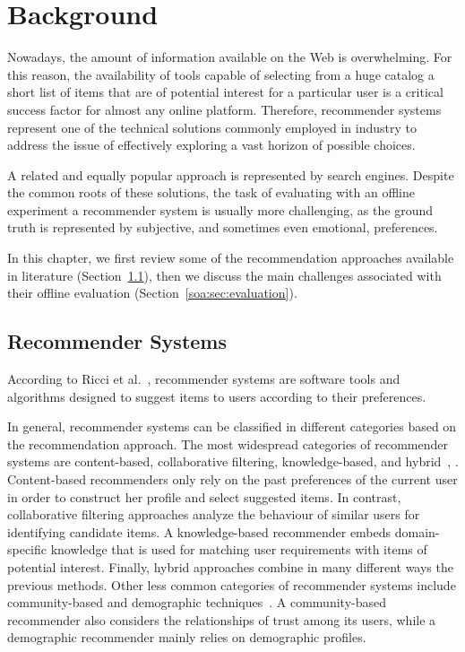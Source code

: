 \chapter{Background}
\label{chap:background}

Nowadays, the amount of information available on the Web is overwhelming. For this reason, the availability of tools capable of selecting from a huge catalog a short list of items that are of potential interest for a particular user is a critical success factor for almost any online platform. Therefore, recommender systems represent one of the technical solutions commonly employed in industry to address the issue of effectively exploring a vast horizon of possible choices.

A related and equally popular approach is represented by search engines. Despite the common roots of these solutions, the task of evaluating with an offline experiment a recommender system is usually more challenging, as the ground truth is represented by subjective, and sometimes even emotional, preferences.

In this chapter, we first review some of the recommendation approaches available in literature (Section~\ref{soa:sec:recommender}), then we discuss the main challenges associated with their offline evaluation (Section~\ref{soa:sec:evaluation}).

\section{Recommender Systems}
\label{soa:sec:recommender}

According to Ricci et al.~\cite{Ricci2015}, recommender systems are software tools and algorithms designed to suggest items to users according to their preferences.

In general, recommender systems can be classified in different categories based on the recommendation approach. The most widespread categories of recommender systems are content-based, collaborative filtering, knowledge-based, and hybrid~\cite{Adomavicius2005}, . Content-based recommenders only rely on the past preferences of the current user in order to construct her profile and select suggested items. In contrast, collaborative filtering approaches analyze the behaviour of similar users for identifying candidate items. A knowledge-based recommender embeds domain-specific knowledge that is used for matching user requirements with items of potential interest. Finally, hybrid approaches combine in many different ways the previous methods. Other less common categories of recommender systems include community-based and demographic techniques~\cite{Burke2007}. A community-based recommender also considers the relationships of trust among its users, while a demographic recommender mainly relies on demographic profiles.

